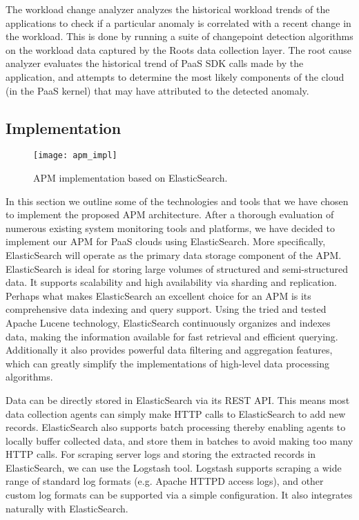 The workload change analyzer analyzes the historical workload trends of the applications to
check if a particular anomaly is correlated with a recent change in the workload.
This is done by running a suite of changepoint detection algorithms on the workload
data captured by the Roots data collection layer. The root cause analyzer evaluates
the historical trend of PaaS SDK calls made by the application, and attempts to
determine the most likely components of the cloud (in the PaaS kernel) that may have 
attributed to the detected anomaly.

\subsection{Implementation}
\begin{figure}
\centering
\texttt{[image: apm\_impl]}
\caption{APM implementation based on ElasticSearch.}
\label{fig:apm_impl}
\end{figure}
In this section we outline some of the technologies and tools that we have chosen to implement the proposed
APM architecture.  After a thorough evaluation of numerous existing system monitoring tools and platforms, 
we have decided to implement our APM for PaaS clouds using ElasticSearch. More specifically, ElasticSearch
will operate as the primary data storage component of the APM. ElasticSearch is ideal for storing large volumes
of structured and semi-structured data. It supports scalability and high availability via sharding and replication.
Perhaps what makes ElasticSearch an excellent choice for an APM is its comprehensive data indexing and
query support. Using the tried and tested Apache Lucene technology, ElasticSearch continuously organizes
and indexes data, making the information available for fast retrieval and efficient querying. 
Additionally it also provides
powerful data filtering and aggregation features, which can greatly simplify the implementations of high-level
data processing algorithms.

Data can be directly stored in ElasticSearch via its REST API. This means most data collection agents can 
simply make HTTP calls to ElasticSearch to add new records. ElasticSearch also supports batch 
processing thereby enabling agents to locally buffer collected data, and store them in batches to avoid
making too many HTTP calls. For scraping server logs and storing the extracted records in ElasticSearch,
we can use the Logstash tool. Logstash supports scraping a wide range of standard log formats (e.g. 
Apache HTTPD access logs), and other custom log formats can be supported via a simple configuration.
It also integrates naturally with ElasticSearch.

